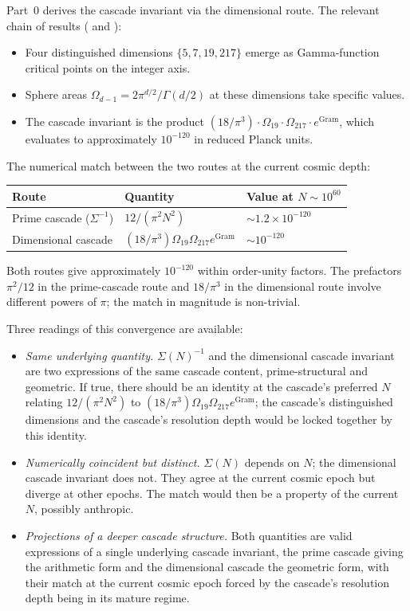 \documentclass[11pt,a4paper]{article}
\begin{document}
Part~0 derives the cascade invariant via the dimensional route. The
relevant chain of results ( and
):
\begin{itemize}
\item Four distinguished dimensions $\{5, 7, 19, 217\}$ emerge as
Gamma-function critical points on the integer axis.
\item Sphere areas $\Omega_{d-1} = 2\pi^{d/2}/\Gamma(d/2)$ at these
dimensions take specific values.
\item The cascade invariant is the product
$(18/\pi^3) \cdot \Omega_{19} \cdot \Omega_{217} \cdot e^{\mathrm{Gram}}$,
which evaluates to approximately $10^{-120}$ in reduced Planck units.
\end{itemize}

\noindent The numerical match between the two routes at the current
cosmic depth:

\begin{center}
\begin{tabular}{lll}
\toprule
Route & Quantity & Value at $N \sim 10^{60}$ \\
\midrule
Prime cascade ($\Sigma^{-1}$) & $12/(\pi^2 N^2)$ & $\sim 1.2 \times 10^{-120}$ \\
Dimensional cascade & $(18/\pi^3) \Omega_{19} \Omega_{217} e^{\mathrm{Gram}}$ & $\sim 10^{-120}$ \\
\bottomrule
\end{tabular}
\end{center}

\noindent Both routes give approximately $10^{-120}$ within
order-unity factors. The prefactors $\pi^2/12$ in the prime-cascade
route and $18/\pi^3$ in the dimensional route involve different
powers of $\pi$; the match in magnitude is non-trivial.

Three readings of this convergence are available:

\begin{itemize}
\item[(a)] \emph{Same underlying quantity.} $\Sigma(N)^{-1}$ and the
dimensional cascade invariant are two expressions of the same
cascade content, prime-structural and geometric. If true, there
should be an identity at the cascade's preferred $N$ relating
$12/(\pi^2 N^2)$ to $(18/\pi^3) \Omega_{19} \Omega_{217}
e^{\mathrm{Gram}}$; the cascade's distinguished dimensions and
the cascade's resolution depth would be locked together by this
identity.
\item[(b)] \emph{Numerically coincident but distinct.} $\Sigma(N)$
depends on $N$; the dimensional cascade invariant does not. They
agree at the current cosmic epoch but diverge at other epochs. The
match would then be a property of the current $N$, possibly
anthropic.
\item[(c)] \emph{Projections of a deeper cascade structure.} Both
quantities are valid expressions of a single underlying cascade
invariant, the prime cascade giving the arithmetic form and the
dimensional cascade the geometric form, with their match at the
current cosmic epoch forced by the cascade's resolution depth being
in its mature regime.
\end{itemize}
\end{document}
